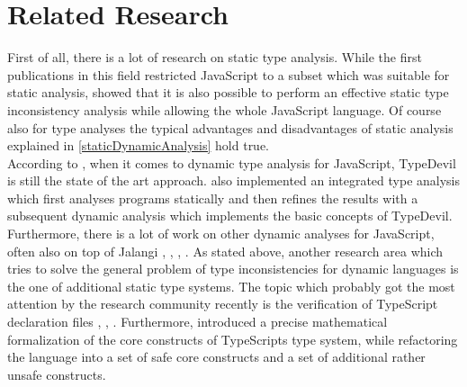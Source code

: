\documentclass[runningheads,a4paper]{llncs}
\begin{document}

\section{Related Research}

First of all, there is a lot of research on static type analysis.
While the first publications in this field restricted JavaScript to a subset which was suitable for static analysis, \cite{DBLP:conf/sas/JensenMT09} showed that it is also possible to perform an effective static type inconsistency analysis while allowing the whole JavaScript language.
Of course also for type analyses the typical advantages and disadvantages of static analysis explained in \ref{staticDynamicAnalysis} hold true.\\
According to \cite{DBLP:conf/icse/TanXCLYS17}, when it comes to dynamic type analysis for JavaScript, TypeDevil is still the state of the art approach. 
\cite{DBLP:conf/icse/TanXCLYS17} also implemented an integrated type analysis which first analyses programs statically and then refines the results with a subsequent dynamic analysis which implements the basic concepts of TypeDevil.
Furthermore, there is a lot of work on other dynamic analyses for JavaScript, often also on top of Jalangi \cite{DBLP:phd/basesearch/Austin13}, \cite{DBLP:conf/issta/GongPSS15}, \cite{DBLP:conf/sigsoft/GongPS15}, \cite{DBLP:conf/sigsoft/JensenSSC15}.
As stated above, another research area which tries to solve the general problem of type inconsistencies for dynamic languages is the one of additional static type systems.
The topic which probably got the most attention by the research community recently is the verification of TypeScript declaration files \cite{DBLP:conf/fase/KristensenM17}, \cite{DBLP:conf/ecoop/WilliamsMWZ17}, \cite{DBLP:journals/pacmpl/KristensenM17}.
Furthermore, \cite{DBLP:conf/ecoop/BiermanAT14} introduced a precise mathematical formalization of the core constructs of TypeScripts type system, while refactoring the language into a set of safe core constructs and a set of additional rather unsafe constructs.
\end{document}
